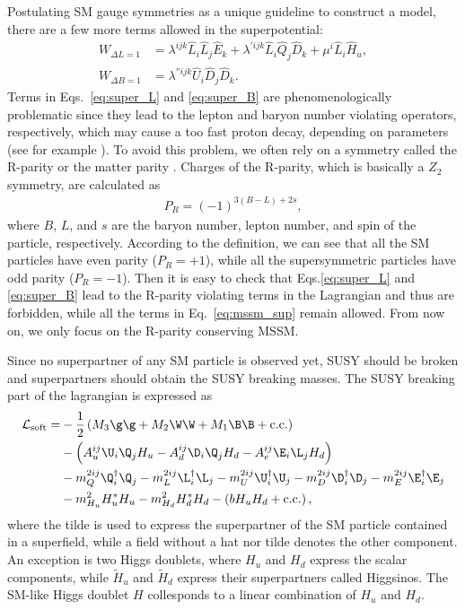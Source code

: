 \documentclass[12pt,twoside,book]{article}
\begin{document}
Postulating SM gauge symmetries as a unique guideline to construct a model, there are a few more terms allowed in the superpotential:
\begin{align}
  W_{\Delta L=1} &= \lambda^{ijk} \hat{L}_i \hat{L}_j \hat{E}_k + \lambda^{'ijk} \hat{L}_i \hat{Q}_j \hat{D}_k
  + \mu^i \hat{L}_i \hat{H}_u, \label{eq:super_L} \\
  W_{\Delta B=1} &= \lambda^{''ijk} \hat{U}_i \hat{D}_j \hat{D}_k. \label{eq:super_B}
\end{align}
Terms in Eqs.~\eqref{eq:super_L} and \eqref{eq:super_B} are phenomenologically problematic since they lead to the lepton and baryon number violating operators, respectively, which may cause a too fast proton decay, depending on parameters (see for example \cite{Sakai:1981pk}).
To avoid this problem, we often rely on a symmetry called the R-parity \cite{Farrar:1978xj} or the matter parity \cite{Dimopoulos:1981zb, Weinberg:1981wj, Sakai:1981pk, Dimopoulos:1981yj}.
Charges of the R-parity, which is basically a $Z_2$ symmetry, are calculated as
\begin{align}
  P_R = (-1)^{3(B-L)+2s},
\end{align}
where $B$, $L$, and $s$ are the baryon number, lepton number, and spin of the particle, respectively.
According to the definition, we can see that all the SM particles have even parity ($P_R = +1$), while all the supersymmetric particles have odd parity ($P_R = -1$).
Then it is easy to check that Eqs.\eqref{eq:super_L} and \eqref{eq:super_B} lead to the R-parity violating terms in the Lagrangian and thus are forbidden, while all the terms in Eq.~\eqref{eq:mssm_sup} remain allowed.
From now on, we only focus on the R-parity conserving MSSM.

Since no superpartner of any SM particle is observed yet, SUSY should be broken and superpartners should obtain the SUSY breaking masses.  
The SUSY breaking part of the lagrangian is expressed as
\begin{align}
  \mathcal{L}_{\mathrm{soft}} =&
  -\frac{1}{2} \left( M_3 \g \g + M_2 \W \W + M_1 \B \B + \mathrm{c.c.} \right) \notag \\&
  -\left( A_u^{ij} \U_i \Q_j H_u - A_d^{ij} \D_i \Q_j H_d - A_e^{ij} \E_i \L_j H_d \right) \notag \\&
  -m_Q^{2ij} \Q^\dagger_i \Q_j - m_L^{2ij} \L^\dagger_i \L_j - m_U^{2ij} \U^\dagger_i \U_j
  -m_D^{2ij} \D^\dagger_i \D_j - m_E^{2ij} \E^\dagger_i \E_j \notag \\&
  -m_{H_u}^2 H_u^{*} H_u - m_{H_d}^2 H_d^{*} H_d - \left( b H_u H_d + \mathrm{c.c.} \right),
  \label{eq:mssm_soft}
\end{align}
where the tilde is used to express the superpartner of the SM particle contained in a superfield, while a field without a hat nor tilde denotes the other component.
An exception is two Higgs doublets, where $H_u$ and $H_d$ express the scalar components, while $\tilde{H}_u$ and $\tilde{H}_d$ express their superpartners called Higgsinos.
The SM-like Higgs doublet $H$ collesponds to a linear combination of $H_u$ and $H_d$.
\end{document}
